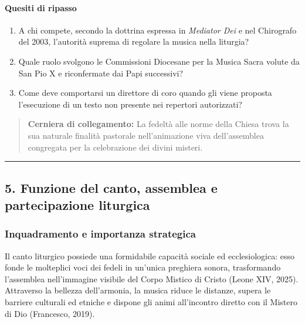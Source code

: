 \documentclass[12pt,a4paper]{article}
\begin{document}
	\paragraph{Quesiti di ripasso}\label{quesiti-di-ripasso}
	
	\begin{enumerate}[label=\arabic*.,leftmargin=*]
		\item A chi compete, secondo la dottrina espressa in \emph{Mediator Dei} e nel Chirografo del 2003, l'autorità suprema di regolare la musica nella liturgia?
		\item Quale ruolo svolgono le Commissioni Diocesane per la Musica Sacra volute da San Pio X e riconfermate dai Papi successivi?
		\item Come deve comportarsi un direttore di coro quando gli viene proposta l'esecuzione di un testo non presente nei repertori autorizzati?
	\end{enumerate}
	
	\begin{quote}
		\textbf{Cerniera di collegamento:} La fedeltà alle norme della Chiesa trova la sua naturale finalità pastorale nell'animazione viva dell'assemblea congregata per la celebrazione dei divini misteri.
	\end{quote}
	
	\begin{center}\rule{0.5\linewidth}{0.5pt}\end{center}
	
	\subsection{5. Funzione del canto, assemblea e partecipazione liturgica}\label{funzione-del-canto-assemblea-e-partecipazione-liturgica}
	
	\subsubsection{Inquadramento e importanza strategica}\label{inquadramento-e-importanza-strategica-4}
	
	Il canto liturgico possiede una formidabile capacità sociale ed ecclesiologica: esso fonde le molteplici voci dei fedeli in un'unica preghiera sonora, trasformando l'assemblea nell'immagine visibile del Corpo Mistico di Cristo (Leone XIV, 2025). Attraverso la bellezza dell'armonia, la musica riduce le distanze, supera le barriere culturali ed etniche e dispone gli animi all'incontro diretto con il Mistero di Dio (Francesco, 2019).
	
\end{document}
